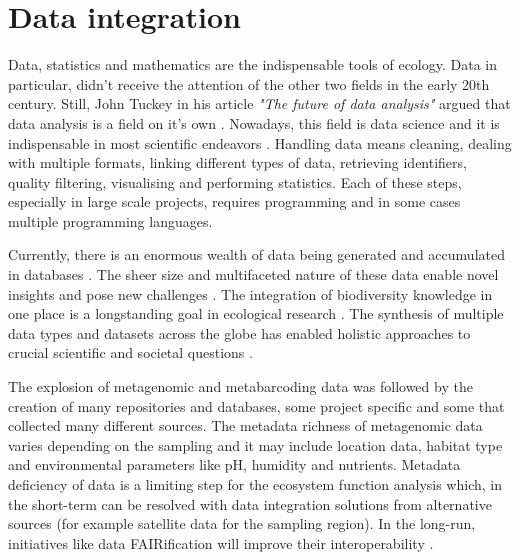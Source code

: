 \section{Data integration}
\label{sec:dataintegration}


Data, statistics and mathematics are the indispensable tools of ecology.
Data in particular, didn't receive the attention of the other two fields in the early 20th 
century. Still, John Tuckey in his article \textit{"The future of data analysis"} 
argued that data analysis is a field on it's own \parencite{tukey1962}.
Nowadays, this field is data science and it is indispensable in most scientific endeavors \parencite{peng2022perspective}. 
Handling data means cleaning, dealing with multiple formats, linking different types 
of data, retrieving identifiers, quality filtering, visualising and performing statistics.
Each of these steps, especially in large scale projects, requires programming and 
in some cases multiple programming languages. 

Currently, there is an enormous wealth of data being generated and 
accumulated in databases \parencite{thessen2021from}. 
The sheer size and multifaceted nature of these data 
enable novel insights and pose new challenges \parencite{michener_ecological_2015}.
The integration of biodiversity knowledge in one place is a longstanding
goal in ecological research \parencite{Walter_2012}. The synthesis of multiple
data types and datasets across the globe has enabled 
holistic approaches to crucial scientific and societal questions \parencite{heberling_j_mason_data_2021}.



The explosion of metagenomic and metabarcoding data was followed by the creation
of many repositories and databases, some project specific and some that
collected many different sources. The metadata richness of metagenomic data
varies depending on the sampling and it may include location data, habitat type
and environmental parameters like pH, humidity and nutrients. Metadata
deficiency of data is a limiting step for the ecosystem function analysis
which, in the short-term can be resolved with data integration solutions from
alternative sources (for example satellite data for the sampling region). In
the long-run, initiatives like data FAIRification will improve their
interoperability \parencite{wilkinson2016the-fair}.

